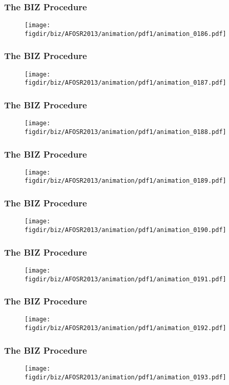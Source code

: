 \documentclass[13pt]{beamer}
\newcommand{\figdir}{../../fig}
\begin{document}
\begin{frame}\frametitle{The BIZ Procedure}\begin{figure}\texttt{[image: \\figdir/biz/AFOSR2013/animation/pdf1/animation\_0186.pdf]}\end{figure}\end{frame}
\begin{frame}\frametitle{The BIZ Procedure}\begin{figure}\texttt{[image: \\figdir/biz/AFOSR2013/animation/pdf1/animation\_0187.pdf]}\end{figure}\end{frame}
\begin{frame}\frametitle{The BIZ Procedure}\begin{figure}\texttt{[image: \\figdir/biz/AFOSR2013/animation/pdf1/animation\_0188.pdf]}\end{figure}\end{frame}
\begin{frame}\frametitle{The BIZ Procedure}\begin{figure}\texttt{[image: \\figdir/biz/AFOSR2013/animation/pdf1/animation\_0189.pdf]}\end{figure}\end{frame}
\begin{frame}\frametitle{The BIZ Procedure}\begin{figure}\texttt{[image: \\figdir/biz/AFOSR2013/animation/pdf1/animation\_0190.pdf]}\end{figure}\end{frame}
\begin{frame}\frametitle{The BIZ Procedure}\begin{figure}\texttt{[image: \\figdir/biz/AFOSR2013/animation/pdf1/animation\_0191.pdf]}\end{figure}\end{frame}
\begin{frame}\frametitle{The BIZ Procedure}\begin{figure}\texttt{[image: \\figdir/biz/AFOSR2013/animation/pdf1/animation\_0192.pdf]}\end{figure}\end{frame}
\begin{frame}\frametitle{The BIZ Procedure}\begin{figure}\texttt{[image: \\figdir/biz/AFOSR2013/animation/pdf1/animation\_0193.pdf]}\end{figure}\end{frame}
\end{document}
